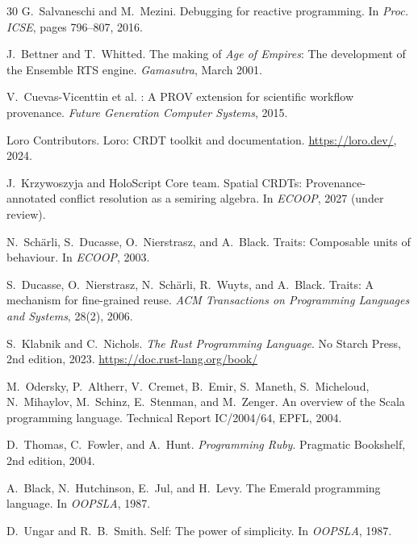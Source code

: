 \documentclass[sigconf,nonacm]{acmart}
\begin{document}
\begin{thebibliography}{30}
G.~Salvaneschi and M.~Mezini.
\newblock Debugging for reactive programming.
\newblock In \emph{Proc. ICSE}, pages 796--807, 2016.

J.~Bettner and T.~Whitted.
\newblock The making of \emph{Age of Empires}: The development of the
  Ensemble RTS engine.
\newblock \emph{Gamasutra}, March 2001.

V.~Cuevas-Vicenttin et al.
: A {PROV} extension for scientific workflow provenance.
\newblock \emph{Future Generation Computer Systems}, 2015.

{Loro Contributors}.
\newblock Loro: {CRDT} toolkit and documentation.
\newblock \url{https://loro.dev/}, 2024.

J.~Krzywoszyja and {HoloScript Core team}.
\newblock Spatial {CRDT}s: Provenance-annotated conflict resolution as a semiring algebra.
\newblock In \emph{ECOOP}, 2027 (under review).

N.~Sch\"arli, S.~Ducasse, O.~Nierstrasz, and A.~Black.
\newblock Traits: Composable units of behaviour.
\newblock In \emph{ECOOP}, 2003.

S.~Ducasse, O.~Nierstrasz, N.~Sch\"arli, R.~Wuyts, and A.~Black.
\newblock Traits: A mechanism for fine-grained reuse.
\newblock \emph{ACM Transactions on Programming Languages and Systems}, 28(2), 2006.

S.~Klabnik and C.~Nichols.
\newblock \emph{The Rust Programming Language}.
\newblock No Starch Press, 2nd edition, 2023.
\newblock \url{https://doc.rust-lang.org/book/}

M.~Odersky, P.~Altherr, V.~Cremet, B.~Emir, S.~Maneth, S.~Micheloud,
N.~Mihaylov, M.~Schinz, E.~Stenman, and M.~Zenger.
\newblock An overview of the Scala programming language.
\newblock Technical Report IC/2004/64, EPFL, 2004.

D.~Thomas, C.~Fowler, and A.~Hunt.
\newblock \emph{Programming Ruby}.
\newblock Pragmatic Bookshelf, 2nd edition, 2004.

A.~Black, N.~Hutchinson, E.~Jul, and H.~Levy.
\newblock The Emerald programming language.
\newblock In \emph{OOPSLA}, 1987.

D.~Ungar and R.~B.~Smith.
\newblock Self: The power of simplicity.
\newblock In \emph{OOPSLA}, 1987.


\end{thebibliography}
\end{document}
